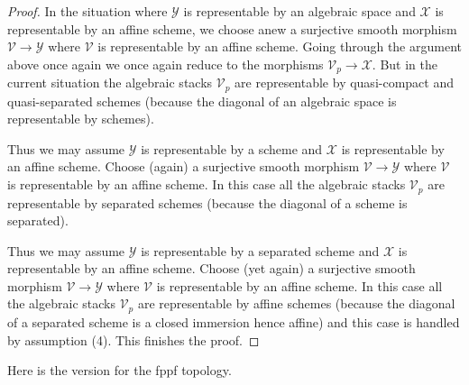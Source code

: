 \documentclass{stacks-project}
\theoremstyle{plain}
\theoremstyle{definition}
\theoremstyle{remark}
\numberwithin{equation}{subsection}
\begin{document}
\begin{proof}
\medskip\noindent
In the situation where $\mathcal{Y}$ is representable by an algebraic
space and $\mathcal{X}$ is representable by an affine scheme, we choose
anew a surjective smooth morphism $\mathcal{V} \to \mathcal{Y}$ where
$\mathcal{V}$ is representable by an affine scheme. Going through the
argument above once again we once again reduce to the morphisms
$\mathcal{V}_p \to \mathcal{X}$. But in the current situation the algebraic
stacks $\mathcal{V}_p$ are representable by quasi-compact and quasi-separated
schemes (because the diagonal of an algebraic space is representable by
schemes).

\medskip\noindent
Thus we may assume $\mathcal{Y}$ is representable by a scheme and
$\mathcal{X}$ is representable by an affine scheme. Choose (again)
a surjective smooth morphism $\mathcal{V} \to \mathcal{Y}$ where
$\mathcal{V}$ is representable by an affine scheme. In this case all
the algebraic stacks $\mathcal{V}_p$ are representable by separated
schemes (because the diagonal of a scheme is separated).

\medskip\noindent
Thus we may assume $\mathcal{Y}$ is representable by a separated scheme and
$\mathcal{X}$ is representable by an affine scheme. Choose (yet again)
a surjective smooth morphism $\mathcal{V} \to \mathcal{Y}$ where
$\mathcal{V}$ is representable by an affine scheme. In this case all
the algebraic stacks $\mathcal{V}_p$ are representable by affine schemes
(because the diagonal of a separated scheme is a closed immersion hence affine)
and this case is handled by assumption (4).
This finishes the proof.
\end{proof}

\noindent
Here is the version for the fppf topology.
\end{document}
